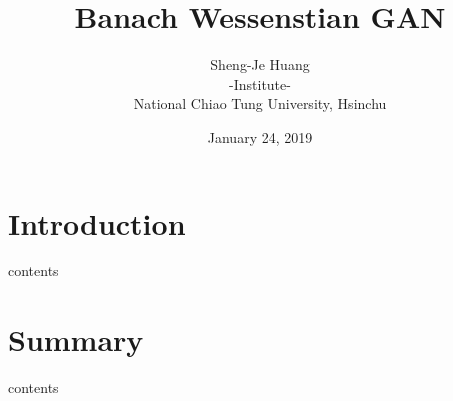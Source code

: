\documentclass[landscape,headrule,footrule]{foils}
\begin{document}
\title       {Banach Wessenstian GAN}
\author      {\large Sheng-Je Huang \\[1em]
              -Institute- \\
              National Chiao Tung University, Hsinchu}
\date        {January 24, 2019}
\MyLogo      {}
\Restriction {}
\rightfooter {\thepage}
\leftheader  {}
\maketitle
\tableofcontents

\section{Introduction}
\tableofcontents

\begin{frame}[\secname]
\begin{center}
contents
\end{center}
\end{frame}

\section{Summary}
\tableofcontents
\begin{frame}[\secname]
\begin{center}
contents
\end{center}
\end{frame}


\endslide
\end{document}
